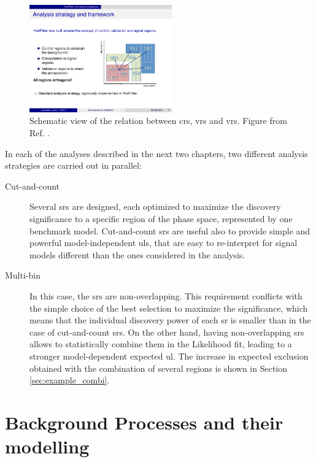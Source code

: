 \begin{figure}
\centering
\includegraphics[width=0.55\textwidth]{figures/susy_common/CR_VR}
\caption{Schematic view of the relation between \glspl{cr}, \glspl{vr} and \glspl{vr}. Figure from Ref. \cite{Baak:2014wma}.}
\label{fig:susy_common:CRschema}
\end{figure}
 
In each of the analyses described in the next two chapters, two different analysis strategies are carried out in parallel:
\begin{description}
\item[Cut-and-count] Several \glspl{sr} are designed, each optimized to maximize the discovery significance to a specific region of the phase space, represented by one benchmark model. Cut-and-count \glspl{sr} are useful also to provide simple and powerful model-independent \glspl{ul}, that are easy to re-interpret for signal models different than the ones considered in the analysis. 

\item[Multi-bin] In this case, the \glspl{sr} are non-overlapping. This requirement conflicts with the simple choice of the best selection to maximize the significance, which means that the individual discovery power of each \gls{sr} is smaller than in the case of cut-and-count \glspl{sr}. On the other hand, having non-overlapping \glspl{sr} allows to statistically combine them in the Likelihood fit, leading to a stronger model-dependent expected \gls{ul}. The increase in expected exclusion obtained with the combination of several regions is shown in Section \ref{sec:example_combi}.
 
\end{description}



\section{Background Processes and their modelling}
\label{sec:common_backgrounds}

